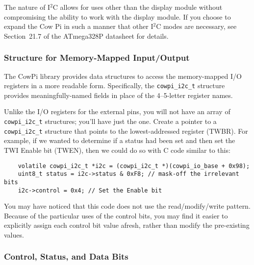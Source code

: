 The nature of I$^2$C allows for uses other than the display module without compromising the ability to work with the display module.
If you choose to expand the Cow Pi in such a manner that other I$^2$C modes are necessary, see Section~21.7 of the ATmega328P datasheet\cite{ATmega328P} for details.

\subsubsection{Structure for Memory-Mapped Input/Output} \label{subsubsec:TWIstruct}

The CowPi library provides data structures to access the memory-mapped I/O registers in a more readable form.
Specifically, the \lstinline{cowpi_i2c_t} structure provides meaningfully-named fields in place of the 4--5-letter register names.



Unlike the I/O registers for the external pins, you will not have an array of \lstinline{cowpi_i2c_t} structures;
you'll have just the one.
Create a pointer to a \lstinline{cowpi_i2c_t} structure that points to the lowest-addressed register (TWBR).
For example, if we wanted to determine if a status had been set and then set the TWI Enable bit (TWEN), then we could do so with C code similar to this:

\begin{lstlisting}
    volatile cowpi_i2c_t *i2c = (cowpi_i2c_t *)(cowpi_io_base + 0x98);
    uint8_t status = i2c->status & 0xF8; // mask-off the irrelevant bits
    i2c->control = 0x4; // Set the Enable bit
\end{lstlisting}


You may have noticed that this code does not use the read/modify/write pattern.
Because of the particular uses of the control bits, you may find it easier to explicitly assign each control bit value afresh, rather than modify the pre-existing values.

\subsubsection{Control, Status, and Data Bits} \label{subsubsec:TWIbits}

